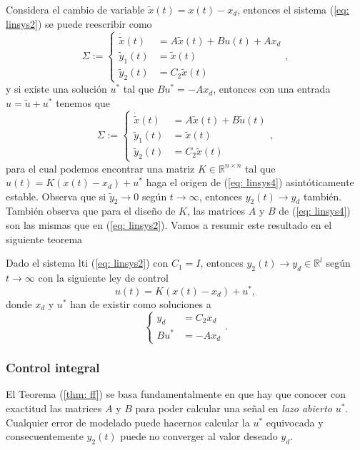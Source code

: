 Considera el cambio de variable $\tilde x(t) = x(t) - x_d$, entonces el sistema (\ref{eq: linsys2}) se puede reescribir como
\begin{equation}
	\Sigma := \begin{cases}
		\dot{\tilde x}(t) &= A\tilde x(t) + Bu(t) + Ax_d \\
	\tilde y_1(t) &= \tilde x(t)  \\
	\tilde y_2(t) &= C_2\tilde x(t)
	\end{cases},
	\label{eq: linsys3}
\end{equation}
y si existe una solución $u^*$ tal que $Bu^* = -Ax_d$, entonces con una entrada $u = \tilde u + u^*$ tenemos que
\begin{equation}
	\Sigma := \begin{cases}
		\dot{\tilde x}(t) &= A\tilde x(t) + B\tilde u(t)  \\
	\tilde y_1(t) &= \tilde x(t)  \\
	\tilde y_2(t) &= C_2\tilde x(t) 
	\end{cases},
	\label{eq: linsys4}
\end{equation}
para el cual podemos encontrar una matriz $K\in\mathbb{R}^{n\times n}$ tal que $u(t) = K (x(t) - x_d) + u^*$ haga el origen de (\ref{eq: linsys4}) asintóticamente estable. Observa que si $\tilde y_2 \to 0$ según $t\to\infty$, entonces $y_2(t) \to y_d$ también. También observa que para el diseño de $K$, las matrices $A$ y $B$ de (\ref{eq: linsys4}) son las mismas que en (\ref{eq: linsys2}). Vamos a resumir este resultado en el siguiente teorema
\begin{theorem}
	Dado el sistema lti (\ref{eq: linsys2}) con $C_1 = I$, entonces $y_2(t) \to y_d\in\mathbb{R}^l$ según $t\to\infty$ con la siguiente ley de control
	$$
	u(t) = K (x(t) - x_d) + u^*,
	$$
	donde $x_d$ y $u^*$ han de existir como soluciones a 
$$
	\begin{cases}
		y_d &= C_2x_d \\
		Bu^* &= -Ax_d
	\end{cases}.
	$$\label{thm: ff}
\end{theorem}


\subsubsection{Control integral}
El Teorema (\ref{thm: ff}) se basa fundamentalmente en que hay que conocer con exactitud las matrices $A$ y $B$ para poder calcular una señal en \emph{lazo abierto} $u^*$. Cualquier error de modelado puede hacernos calcular la $u^*$ equivocada y consecuentemente $y_2(t)$ puede no converger al valor deseado $y_d$.

